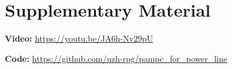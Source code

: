 \section*{Supplementary Material}\label{sec:SupplementaryMaterial}
\textbf{Video: }\href{https://youtu.be/JA6h-Nv29pU}{https://youtu.be/JA6h-Nv29pU}

\textbf{Code: }\href{https://github.com/uzh-rpg/pampc_for_power_line}{https://github.com/uzh-rpg/pampc\_for\_power\_line}

